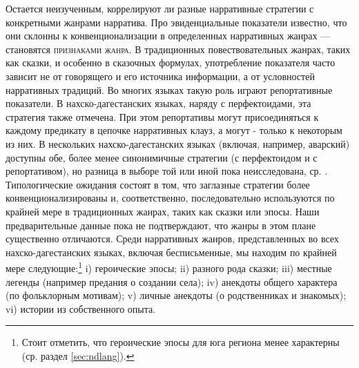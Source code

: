 Остается неизученным, коррелируют ли разные нарративные стратегии с конкретными жанрами нарратива. Про эвиденциальные показатели известно, что они склонны к конвенционализации в определенных нарративных жанрах --- становятся \textsc{признаками жанра}. В традиционных повествовательных жанрах, таких как сказки, и особенно в сказочных формулах, употребление показателя часто зависит не от говорящего и его источника информации, а от условностей нарративных традиций. Во многих языках такую роль играют репортативные показатели. В нахско-дагестанских языках, наряду с перфектоидами, эта стратегия также отмечена. При этом репортативы могут присоединяться к каждому предикату в цепочке нарративных клауз, а могут - только к некоторым из них. В нескольких нахско-дагестанских языках (включая, например, аварский) доступны обе, более менее синонимичные стратегии (с перфектоидом и с репортативом), но разница в выборе той или иной пока неисследована, ср. \citep{forker2018evidavar}. Типологические ожидания состоят в том, что заглазные стратегии более конвенционализированы и, соответственно, последовательно используются по крайней мере в традиционных жанрах, таких как сказки или эпосы. Наши предварительные данные пока не подтверждают, что жанры в этом плане существенно отличаются. 
Среди нарративных жанров, представленных во всех нахско-дагестанских языках, включая бесписьменные, мы находим по крайней мере следующие:\footnote{Стоит отметить, что героические эпосы для юга региона менее характерны (ср. раздел \ref{sec:ndlang}).} i) героические эпосы; ii) разного рода сказки; iii) местные легенды (например предания о создании села); iv) анекдоты общего характера (по фольклорным мотивам); v) личные анекдоты (о родственниках и знакомых); vi) истории из собственного опыта.
